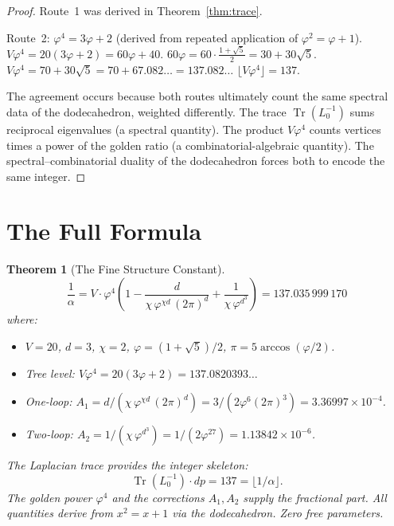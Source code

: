 \documentclass[11pt,a4paper]{article}
\theoremstyle{plain}
\newtheorem{theorem}{Theorem}[section]
\theoremstyle{definition}
\newcommand{\vp}{\varphi}
\DeclareMathOperator{\Tr}{Tr}
\begin{document}
\begin{proof}
Route~1 was derived in Theorem~\ref{thm:trace}.

Route~2: $\vp^4 = 3\vp + 2$ (derived from repeated application of
$\vp^2 = \vp + 1$).  $V\vp^4 = 20(3\vp + 2) = 60\vp + 40$.
$60\vp = 60 \cdot \frac{1+\sqrt{5}}{2} = 30 + 30\sqrt{5}$.
$V\vp^4 = 70 + 30\sqrt{5} = 70 + 67.082\ldots = 137.082\ldots$
$\lfloor V\vp^4 \rfloor = 137$.

The agreement occurs because both routes ultimately count the same
spectral data of the dodecahedron, weighted differently.  The trace
$\Tr(L_0^{-1})$ sums reciprocal eigenvalues (a spectral quantity).
The product $V\vp^4$ counts vertices times a power of the golden ratio
(a combinatorial-algebraic quantity).  The spectral--combinatorial
duality of the dodecahedron forces both to encode the same integer.
\end{proof}

\section{The Full Formula}\label{sec:full}

\begin{theorem}[The Fine Structure Constant]\label{thm:fsc}
\[
  \boxed{\;
    \frac{1}{\alpha}
    = V \cdot \vp^4 \left(
        1 - \frac{d}{\chi\,\vp^{\chi d}\,(2\pi)^d}
        + \frac{1}{\chi\,\vp^{d^3}}
      \right)
    = 137.035\,999\,170
  \;}
\]
where:
\begin{itemize}[nosep]
  \item $V = 20$, $d = 3$, $\chi = 2$, $\vp = (1+\sqrt{5})/2$,
    $\pi = 5\arccos(\vp/2)$.
  \item Tree level: $V\vp^4 = 20(3\vp + 2) = 137.0820393\ldots$
  \item One-loop: $A_1 = d/(\chi\,\vp^{\chi d}\,(2\pi)^d) = 3/(2\vp^6(2\pi)^3)
    = 3.36997 \times 10^{-4}$.
  \item Two-loop: $A_2 = 1/(\chi\,\vp^{d^3}) = 1/(2\vp^{27})
    = 1.13842 \times 10^{-6}$.
\end{itemize}
The Laplacian trace provides the integer skeleton:
\[
  \Tr(L_0^{-1}) \cdot dp = 137 = \lfloor 1/\alpha \rfloor.
\]
The golden power $\vp^4$ and the corrections $A_1, A_2$ supply the
fractional part.  All quantities derive from $x^2 = x + 1$ via the
dodecahedron.  Zero free parameters.
\end{theorem}
\end{document}
